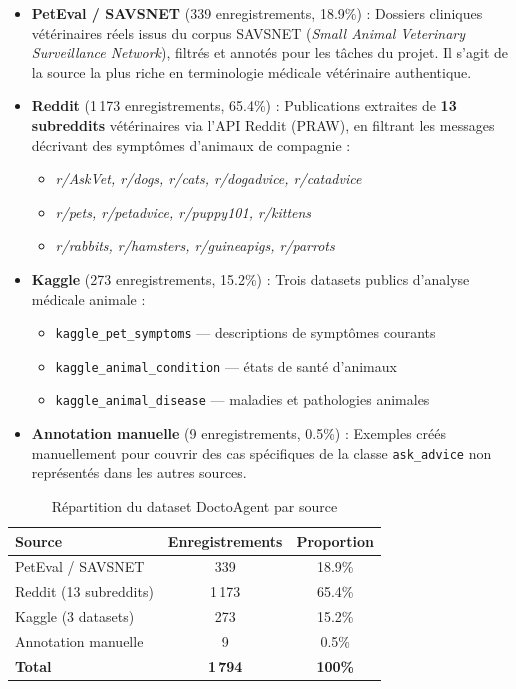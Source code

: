 \begin{itemize}
    \item \textbf{PetEval / SAVSNET} (339 enregistrements, 18.9\%) : Dossiers cliniques vétérinaires réels issus du corpus SAVSNET (\textit{Small Animal Veterinary Surveillance Network}), filtrés et annotés pour les tâches du projet. Il s'agit de la source la plus riche en terminologie médicale vétérinaire authentique.

    \item \textbf{Reddit} (1\,173 enregistrements, 65.4\%) : Publications extraites de \textbf{13 subreddits} vétérinaires via l'API Reddit (PRAW), en filtrant les messages décrivant des symptômes d'animaux de compagnie :
    \begin{itemize}
        \item \textit{r/AskVet, r/dogs, r/cats, r/dogadvice, r/catadvice}
        \item \textit{r/pets, r/petadvice, r/puppy101, r/kittens}
        \item \textit{r/rabbits, r/hamsters, r/guineapigs, r/parrots}
    \end{itemize}

    \item \textbf{Kaggle} (273 enregistrements, 15.2\%) : Trois datasets publics d'analyse médicale animale :
    \begin{itemize}
        \item \texttt{kaggle\_pet\_symptoms} — descriptions de symptômes courants
        \item \texttt{kaggle\_animal\_condition} — états de santé d'animaux
        \item \texttt{kaggle\_animal\_disease} — maladies et pathologies animales
    \end{itemize}

    \item \textbf{Annotation manuelle} (9 enregistrements, 0.5\%) : Exemples créés manuellement pour couvrir des cas spécifiques de la classe \texttt{ask\_advice} non représentés dans les autres sources.
\end{itemize}

\begin{table}[H]
\centering
\caption{Répartition du dataset DoctoAgent par source}
\label{tab:dataset-sources}
\renewcommand{\arraystretch}{1.4}
\begin{tabular}{|l|c|c|}
\hline
\textbf{Source} & \textbf{Enregistrements} & \textbf{Proportion} \\
\hline
PetEval / SAVSNET         & 339   & 18.9\% \\
Reddit (13 subreddits)    & 1\,173 & 65.4\% \\
Kaggle (3 datasets)       & 273   & 15.2\% \\
Annotation manuelle       & 9     &  0.5\% \\
\hline
\textbf{Total}            & \textbf{1\,794} & \textbf{100\%} \\
\hline
\end{tabular}
\end{table}

